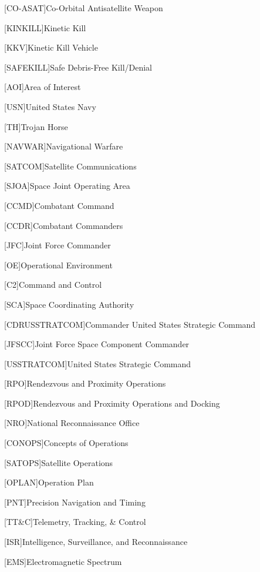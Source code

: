 [CO-ASAT]{Co-Orbital Antisatellite Weapon}

[KINKILL]{Kinetic Kill}

[KKV]{Kinetic Kill Vehicle}

[SAFEKILL]{Safe Debris-Free Kill/Denial}

[AOI]{Area of Interest}

[USN]{United States Navy}

[TH]{Trojan Horse}

[NAVWAR]{Navigational Warfare}

[SATCOM]{Satellite Communications}

[SJOA]{Space Joint Operating Area}

[CCMD]{Combatant Command}

[CCDR]{Combatant Commanders}

[JFC]{Joint Force Commander}

[OE]{Operational Environment}

[C2]{Command and Control}

[SCA]{Space Coordinating Authority}

[CDRUSSTRATCOM]{Commander United States Strategic Command}

[JFSCC]{Joint Force Space Component Commander}

[USSTRATCOM]{United States Strategic Command}

[RPO]{Rendezvous and Proximity Operations}

[RPOD]{Rendezvous and Proximity Operations and Docking}

[NRO]{National Reconnaissance Office}

[CONOPS]{Concepts of Operations}

[SATOPS]{Satellite Operations}

[OPLAN]{Operation Plan}

[PNT]{Precision Navigation and Timing}

[TT\&C]{Telemetry, Tracking, \& Control}

[ISR]{Intelligence, Surveillance, and Reconnaissance}

[EMS]{Electromagnetic Spectrum}

